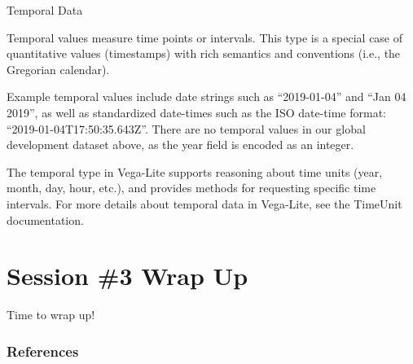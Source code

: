 \documentclass[notes, aspectratio=1610]{beamer}
\begin{document}
\begin{frame}{Temporal Data}

	\small

	Temporal values measure time points or intervals. This type is a special case of quantitative values (timestamps) with rich semantics and conventions (i.e., the Gregorian calendar).

	\vspace{1em}

	Example temporal values include date strings such as “2019-01-04” and “Jan 04 2019”, as well as standardized date-times such as the ISO date-time format: “2019-01-04T17:50:35.643Z”. There are no temporal values in our global development dataset above, as the year field is encoded as an integer.

	\vspace{1em}

	The temporal type in Vega-Lite supports reasoning about time units (year, month, day, hour, etc.), and provides methods for requesting specific time intervals. For more details about temporal data in Vega-Lite, see the TimeUnit documentation.

\end{frame}




\section{Session \#3 Wrap Up}

\begin{frame}{}{}
	\LARGE Time to wrap up!
\end{frame}

\begin{frame}
	\frametitle{References}
	\printbibliography
 \end{frame} 
\end{document}
